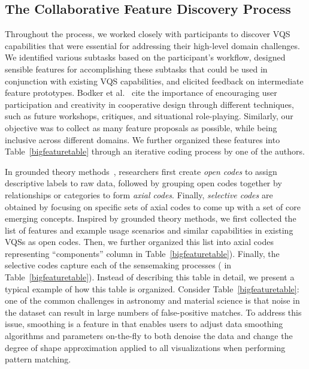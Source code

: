  \subsection{The Collaborative Feature Discovery Process~\label{sec:feature_dsicovery}}
 \par Throughout the  process, we worked closely with participants to discover VQS capabilities that were essential for addressing their high-level domain challenges. We identified various subtasks based on the participant's workflow, designed sensible features for accomplishing these subtasks that could be used in conjunction with existing VQS capabilities, and elicited feedback on intermediate feature prototypes. Bodker et al.~\cite{BodkerGronbaek} cite the importance of encouraging user participation and creativity in cooperative design through different techniques, such as future workshops, critiques, and situational role-playing. Similarly, our  objective was to collect as many feature proposals as possible, while being inclusive across different domains. We further organized these features into Table~\ref{bigfeaturetable} through an iterative coding process by one of the authors.
 \par In grounded theory methods~\cite{Muller2012}, researchers first create \emph{open codes} to assign descriptive labels to raw data, followed by grouping open codes together by relationships or categories to form \emph{axial codes}. Finally, \emph{selective codes} are obtained by focusing on specific sets of axial codes to come up with a set of core emerging concepts. Inspired by grounded theory methods, we first collected the list of features and example usage scenarios  and similar capabilities in existing VQSs as open codes. Then, we further organized this list into axial codes representing ``components'' column in Table~\ref{bigfeaturetable}). Finally, the selective codes capture each of the sensemaking processes ( in Table~\ref{bigfeaturetable}). Instead of describing this table in detail, we present a typical example of how this table is organized. Consider  Table~\ref{bigfeaturetable}: one of the common challenges in astronomy and material science is that noise in the dataset can result in large numbers of false-positive matches. To address this issue, smoothing is a feature in \zvpp that enables users to adjust data smoothing algorithms and parameters on-the-fly to both denoise the data and change the degree of shape approximation applied to all visualizations when performing pattern matching. %
